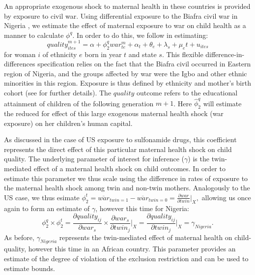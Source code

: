 \documentclass[subeqn]{article}
\begin{document}
\begin{spacing}{1.4}
An appropriate exogenous shock to maternal health in these countries is provided
by exposure to civil war.  Using differential exposure to the Biafra civil war
in Nigeria \citep{Akreshetal2012}, we estimate the effect of maternal exposure to
war on child health as a manner to calculate $\phi^q$.  In order to do this, we
follow \citet{Akreshetal2012} in estimating:
\begin{equation}
  \label{TWINeqn:Nigeria}
  quality^{m+1}_{ites} = \alpha + \phi_2^q war^m_{te}+\alpha_t+\theta_e+\lambda_s+\mu_e t+u_{ites}
\end{equation}
for woman $i$ of ethnicity $e$ born in year $t$ and state $s$.  This flexible
difference-in-differences specification relies on the fact that the Biafra civil
occurred in Eastern region of Nigeria, and the groups affected by war were the
Igbo and other ethnic minorities in this region.  Exposure is thus defined by
ethnicity and mother's birth cohort (see \citet{Akreshetal2012} for further
details).  The $quality$ outcome refers to the educational attainment of children
of the following generation $m+1$.  Here $\hat\phi^q_2$ will estimate the reduced
for effect of this large exogenous maternal health shock (war exposure) on her
children's human capital.  

As discussed in the case of US exposure to sulfonamide drugs, this coefficient
represents the direct effect of this particular maternal health shock on child
quality.  The underlying parameter of interest for inference ($\gamma$) is the
twin-mediated effect of a maternal health shock on child outcomes.  In order
to estimate this parameter we thus scale using the difference in rates of
exposure to the maternal health shock among twin and non-twin mothers.
Analogously to the US case, we thus esimate $\phi_2^t=\overline{war}_{twin=1}
-\overline{war}_{twin=0}=\frac{\partial war}{\partial twin}\bigg|_{X},$ allowing
us once again to form an estimate of $\gamma$, however this time for Nigeria:
\begin{equation}
  \label{TWINeqn:realgammaN}
  \phi_2^q\times\phi_2^t=\frac{\partial quality_{ij}}{\partial war_s}\times
  \frac{\partial war_s}{\partial twin_j}\bigg|_{X}=
  \frac{\partial quality_{ij}}{\partial twin_j}\bigg|_{X}=\gamma_{Nigeria}.
\end{equation}
As before, $\gamma_{Nigeria}$ represents the twin-mediated effect of
maternal health on child-quality, however this time in an African country.
This parameter provides an estimate of the degree of violation of the
exclusion restriction and can be used to estimate \citet{Conleyetal2012}
bounds.



\end{spacing}
\end{document}
